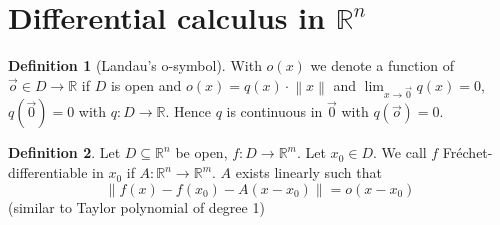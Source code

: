 \documentclass[a4paper,landscape,twocolumn]{article}
\theoremstyle{definition}
\newtheorem{defi}{Definition}
\newcommand\norm[1]{\left\|#1\right\|}
\begin{document}
\section{Differential calculus in $\mathbb R^n$}
\label{sec:diff-in-Rn}
%
\begin{defi}[Landau's o-symbol]
  With $o(x)$ we denote a function of $\vec{o} \in D \to \mathbb R$ if $D$ is open and
  $o(x) = q(x) \cdot \norm{x}$ and $\lim_{x\to\vec{0}} q(x) = 0$, $q(\vec{0}) = 0$ with $q: D \to \mathbb R$.
  Hence $q$ is continuous in $\vec{0}$ with $q(\vec{o}) = 0$.
\end{defi}
\begin{defi}
  Let $D \subseteq \mathbb R^n$ be open, $f: D \to \mathbb R^m$.
  Let $x_0 \in D$. We call $f$ Fréchet-differentiable in $x_0$ if $A: \mathbb R^n \to \mathbb R^m$.
  $A$ exists linearly such that
  \[ \norm{f(x) - f(x_0) - A(x - x_0)} = o(x - x_0) \]
  (similar to Taylor polynomial of degree 1)
\end{defi}
\end{document}
